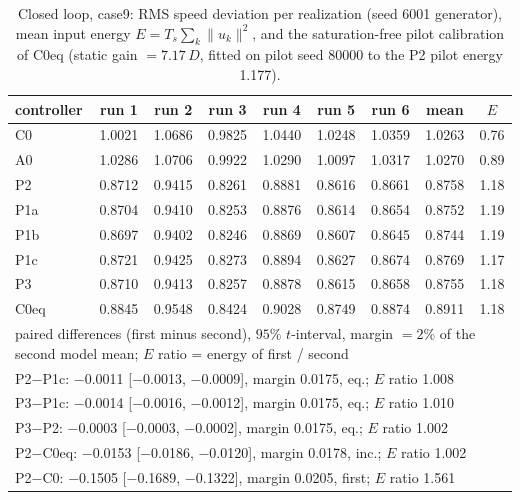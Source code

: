 \begin{table}[H]\centering\small\setlength{\tabcolsep}{3pt}
\caption{Closed loop, case9: RMS speed deviation per realization (seed 6001 generator), mean input energy $E=T_s\sum_k\|u_k\|^2$, and the saturation-free pilot calibration of C0eq (static gain $=7.17\,D$, fitted on pilot seed 80000 to the P2 pilot energy 1.177).}
\label{tab:S:cl_case9}
\begin{tabular}{lcccccccc}
\toprule
controller & run 1 & run 2 & run 3 & run 4 & run 5 & run 6 & mean & $E$\\
\midrule
C0 & 1.0021 & 1.0686 & 0.9825 & 1.0440 & 1.0248 & 1.0359 & 1.0263 & 0.76\\
A0 & 1.0286 & 1.0706 & 0.9922 & 1.0290 & 1.0097 & 1.0317 & 1.0270 & 0.89\\
P2 & 0.8712 & 0.9415 & 0.8261 & 0.8881 & 0.8616 & 0.8661 & 0.8758 & 1.18\\
P1a & 0.8704 & 0.9410 & 0.8253 & 0.8876 & 0.8614 & 0.8654 & 0.8752 & 1.19\\
P1b & 0.8697 & 0.9402 & 0.8246 & 0.8869 & 0.8607 & 0.8645 & 0.8744 & 1.19\\
P1c & 0.8721 & 0.9425 & 0.8273 & 0.8894 & 0.8627 & 0.8674 & 0.8769 & 1.17\\
P3 & 0.8710 & 0.9413 & 0.8257 & 0.8878 & 0.8615 & 0.8658 & 0.8755 & 1.18\\
C0eq & 0.8845 & 0.9548 & 0.8424 & 0.9028 & 0.8749 & 0.8874 & 0.8911 & 1.18\\
\midrule
\multicolumn{9}{p{0.92\textwidth}}{paired differences (first minus second), $95\%$ $t$-interval, margin $=2\%$ of the second model mean; $E$ ratio = energy of first / second}\\
\multicolumn{9}{p{0.92\textwidth}}{P2$-$P1c: $-$0.0011 [$-$0.0013, $-$0.0009], margin 0.0175, eq.; $E$ ratio 1.008}\\
\multicolumn{9}{p{0.92\textwidth}}{P3$-$P1c: $-$0.0014 [$-$0.0016, $-$0.0012], margin 0.0175, eq.; $E$ ratio 1.010}\\
\multicolumn{9}{p{0.92\textwidth}}{P3$-$P2: $-$0.0003 [$-$0.0003, $-$0.0002], margin 0.0175, eq.; $E$ ratio 1.002}\\
\multicolumn{9}{p{0.92\textwidth}}{P2$-$C0eq: $-$0.0153 [$-$0.0186, $-$0.0120], margin 0.0178, inc.; $E$ ratio 1.002}\\
\multicolumn{9}{p{0.92\textwidth}}{P2$-$C0: $-$0.1505 [$-$0.1689, $-$0.1322], margin 0.0205, first; $E$ ratio 1.561}\\
\bottomrule
\end{tabular}
\end{table}

